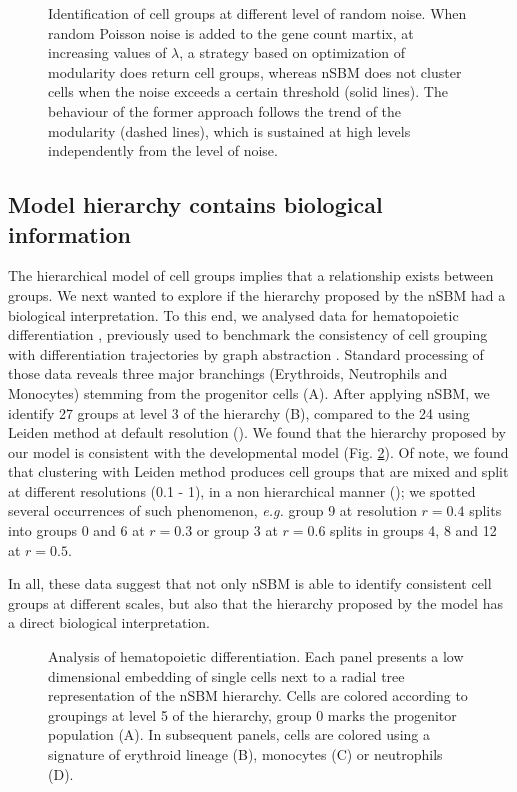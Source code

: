 \documentclass[10pt,letterpaper]{article}
\begin{document}
\begin{figure}[!h]
\centering
\caption[]{Identification of cell groups at different level of random noise. When random Poisson noise is added to the gene count martix, at increasing values of $\lambda$, a strategy based on optimization of modularity does return cell groups, whereas nSBM does not cluster cells when the noise exceeds a certain threshold (solid lines). The behaviour of the former approach follows the trend of the modularity (dashed lines), which is sustained at high levels independently from the level of noise.}\label{Figure_Random}
\end{figure}



\subsection*{Model hierarchy contains biological information}
The hierarchical model of cell groups implies that a relationship exists between groups. We next wanted to explore if the hierarchy proposed by the nSBM had a biological interpretation. To this end, we analysed data for hematopoietic differentiation \cite{paul_2015}, previously used to benchmark the consistency of cell grouping with differentiation trajectories by graph abstraction \cite{wolf_2019}. Standard processing of those data reveals three major branchings (Erythroids, Neutrophils and Monocytes) stemming from the progenitor cells (A). After applying nSBM, we identify 27 groups at level 3 of the hierarchy (B), compared to the 24 using Leiden method at default resolution (). We found that the hierarchy proposed by our model is consistent with the developmental model (Fig. \ref{Figure2}). Of note, we found that clustering with Leiden method produces cell groups that are mixed and split at different resolutions (0.1 - 1), in a non hierarchical manner (); we spotted several occurrences of such phenomenon, \emph{e.g.} group 9 at resolution $r=0.4$ splits into groups 0 and 6 at $r=0.3$ or group 3 at $r=0.6$ splits in groups 4, 8 and 12 at $r=0.5$.

In all, these data suggest that not only nSBM is able to identify consistent cell groups at different scales, but also that the hierarchy proposed by the model has a direct biological interpretation.

\begin{figure}[!h]
\centering
\caption[]{Analysis of hematopoietic differentiation. Each panel presents a low dimensional embedding of single cells next to a radial tree representation of the nSBM hierarchy. Cells are colored according to groupings at level 5 of the hierarchy, group 0 marks the progenitor population (A). In subsequent panels, cells are colored using a signature of erythroid lineage (B), monocytes (C) or neutrophils (D).}\label{Figure2}
\end{figure}
\end{document}
